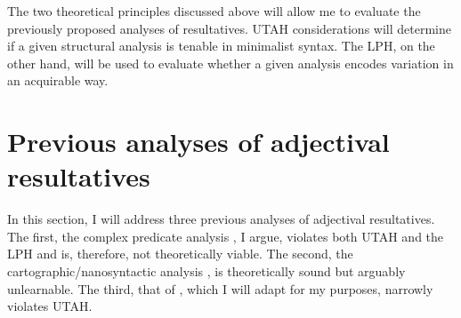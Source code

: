 %
%
%
%
%
%

The two theoretical principles discussed above will allow me to evaluate the previously proposed analyses of resultatives.
UTAH considerations will determine if a given structural analysis is tenable in minimalist syntax.
The LPH, on the other hand, will be used to evaluate whether a given analysis encodes variation in an acquirable way.

\section{Previous analyses of adjectival resultatives}
In this section, I will address three previous analyses of adjectival resultatives.
The first, the complex predicate analysis \parencite{snyder1995language,irimia2012secondary}, I argue, violates both UTAH and the LPH and is, therefore, not theoretically viable.
The second, the cartographic/nanosyntactic analysis \parencite{son2008microparameters}, is theoretically sound but arguably unlearnable.
The third, that of \textcite{kratzer2004building}, which I will adapt for my purposes, narrowly violates UTAH.

